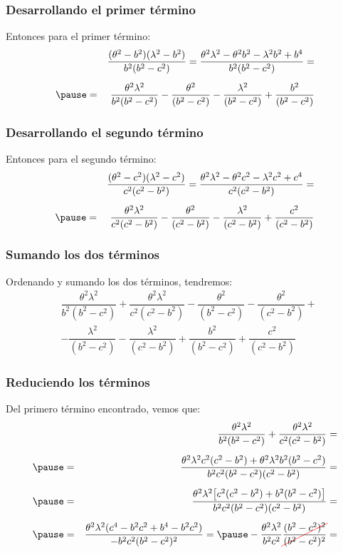 \documentclass[12pt]{beamer}
\begin{document}
\begin{frame}
\frametitle{Desarrollando el primer término}
Entonces para el primer término:
\pause
\begin{eqnarray*}
&{}&\dfrac{(\theta^{2} - b^{2})(\lambda^{2} - b^{2})}{b^{2}(b^{2} - c^{2})} = \dfrac{\theta^{2} \lambda^{2} - \theta^2 b^{2} - \lambda^{2} b^{2} + b^{4}}{b^{2}(b^{2} - c^{2})} = \\[0.5em] \pause
&=& \dfrac{\theta^{2} \lambda^{2}}{b^{2}(b^{2} - c^{2})} - \dfrac{\theta^{2}}{(b^{2} - c^{2})} - \dfrac{\lambda^{2}}{(b^{2} - c^{2})} + \dfrac{b^{2}}{(b^{2} - c^{2})}
\end{eqnarray*}
\end{frame}
\begin{frame}
\frametitle{Desarrollando el segundo término}
Entonces para el segundo término:
\pause
\begin{eqnarray*}
&{}&\dfrac{(\theta^{2} - c^{2})(\lambda^{2} - c^{2})}{c^{2}(c^{2} - b^{2})} = \dfrac{\theta^{2} \lambda^{2} - \theta^2 c^{2} - \lambda^{2} c^{2} + c^{4}}{c^{2}(c^{2} - b^{2})} = \\[0.5em] \pause
&=& \dfrac{\theta^{2} \lambda^{2}}{c^{2}(c^{2} - b^{2})} - \dfrac{\theta^{2}}{(c^{2} - b^{2})} - \dfrac{\lambda^{2}}{(c^{2} - b^{2})} + \dfrac{c^{2}}{(c^{2} - b^{2})}
\end{eqnarray*}
\end{frame}
\begin{frame}
\frametitle{Sumando los dos términos}
Ordenando y sumando los dos términos, tendremos:
\pause
\begin{align*}
&\dfrac{\theta^{2} \lambda^{2}}{b^{2}(b^{2} - c^{2})} + \dfrac{\theta^{2} \lambda^{2}}{c^{2}(c^{2} - b^{2})} - \dfrac{\theta^{2}}{(b^{2} - c^{2})} - \dfrac{\theta^{2}}{(c^{2} - b^{2})} + \\[0.5em] 
&- \dfrac{\lambda^{2}}{(b^{2} - c^{2})} - \dfrac{\lambda^{2}}{(c^{2} - b^{2})} + \dfrac{b^{2}}{(b^{2} - c^{2})} + \dfrac{c^{2}}{(c^{2} - b^{2})}
\end{align*}
\end{frame}
\begin{frame}
\frametitle{Reduciendo los términos}
Del primero término encontrado, vemos que:
\pause
\begin{eqnarray*}
&{}&\dfrac{\theta^{2} \lambda^{2}}{b^{2}(b^{2} - c^{2})} + \dfrac{\theta^{2} \lambda^{2}}{c^{2}(c^{2} - b^{2})} = \\[0.5em] \pause
&=& \dfrac{\theta^{2} \lambda^{2} c^{2} (c^{2} - b^{2}) + \theta^{2} \lambda^{2} b^{2} (b^{2} - c^{2})}{b^{2} c^{2}(b^{2} - c^{2})(c^{2} - b^{2})} = \\[0.5em] \pause
&=& \dfrac{\theta^{2} \lambda^{2} \big[ c^{2} (c^{2} - b^{2}) + b^{2} (b^{2} - c^{2}) \big]}{b^{2} c^{2}(b^{2} - c^{2})(c^{2} - b^{2})} = \\[0.5em] \pause
&=& \dfrac{\theta^{2} \lambda^{2} (c^{4} - b^{2} c^{2} + b^{4} -b^{2} c^{2})}{-b^{2} c^{2} (b^{2} - c^{2})^{2}} = \pause - \dfrac{\theta^{2} \lambda^{2}}{b^{2} c^{2}} \Cancel[red]{\dfrac{(b^{2} - c^{2})^{2}}{(b^{2} - c^{2})^{2}}} =
\end{eqnarray*}
\end{frame}
\end{document}
